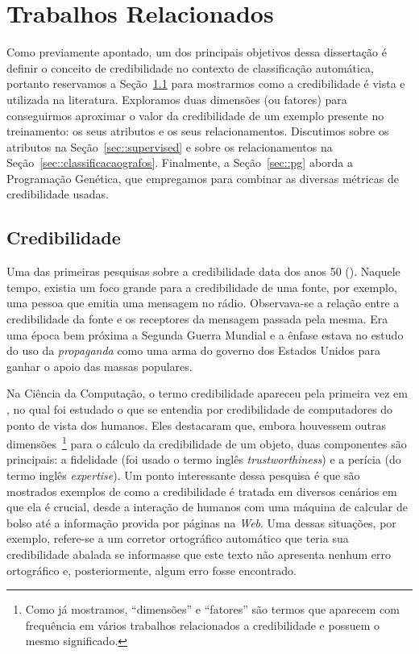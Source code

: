 
\chapter{Trabalhos Relacionados}
\label{cap::related}

Como previamente apontado, um dos principais objetivos dessa dissertação é definir o conceito de credibilidade no contexto de classificação automática, portanto reservamos a 
Seção~\ref{sec::credibilidade} para mostrarmos como a credibilidade é vista e utilizada na literatura.
Exploramos duas dimensões (ou fatores) para conseguirmos aproximar o valor da credibilidade de um exemplo presente no treinamento: os seus atributos e os seus relacionamentos.
Discutimos sobre os atributos na Seção~\ref{sec::supervised} e sobre os relacionamentos na Seção~\ref{sec::classificacaografos}.
Finalmente, a Seção~\ref{sec::pg} aborda a Programação Genética, que empregamos para combinar as diversas métricas de credibilidade usadas. 


\section{Credibilidade}
\label{sec::credibilidade}

Uma das primeiras pesquisas sobre a credibilidade data dos anos 50 (\cite{Hovland51}). Naquele tempo, existia um foco grande para a credibilidade de uma fonte, por exemplo, uma pessoa que emitia uma mensagem no rádio. Observava-se a relação entre a credibilidade da fonte e os receptores da mensagem passada pela mesma. Era uma época bem próxima a Segunda Guerra Mundial e a ênfase estava no estudo do uso da \textit{propaganda} como uma arma do governo dos Estados Unidos para ganhar o apoio das massas populares.

Na Ciência da Computação, o termo credibilidade apareceu pela primeira vez em \cite{Tseng99}, no qual foi estudado o 
que se entendia por credibilidade de computadores do ponto de vista dos humanos.
Eles destacaram que, embora houvessem outras dimensões~\footnote{Como já mostramos, ``dimensões'' e ``fatores'' são termos que aparecem com frequência em vários trabalhos relacionados a credibilidade e possuem o mesmo significado.} para o cálculo da credibilidade de um objeto, duas componentes são principais: a fidelidade (foi usado o termo inglês \textit{trustworthiness}) e a perícia (do termo inglês \textit{expertise}).
Um ponto interessante dessa pesquisa é que são mostrados exemplos de como a credibilidade é tratada em diversos cenários em que ela é crucial, desde a interação de humanos com uma máquina de calcular de bolso até a informação provida por páginas na \textit{Web}.
Uma dessas situações, por exemplo, refere-se a um corretor ortográfico automático que teria sua credibilidade abalada se informasse que este texto não apresenta nenhum erro ortográfico e, posteriormente, algum erro fosse encontrado.

